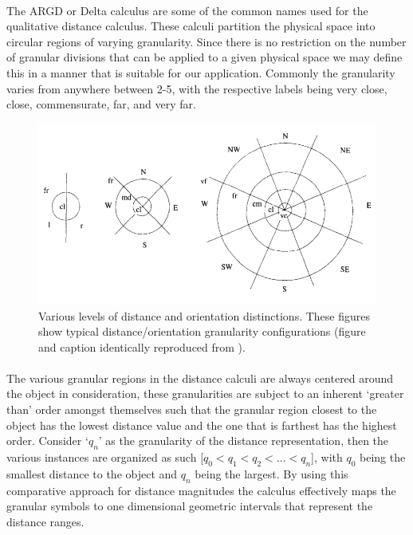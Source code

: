 	\paragraph{}The ARGD or Delta calculus are some of the common names used for the qualitative distance calculus. These calculi partition the physical space into circular regions of varying granularity. Since there is no restriction on the number of granular divisions that can be applied to a given physical space we may define this in a manner that is suitable for our application. Commonly the granularity varies from anywhere between 2-5, with the respective labels being very close, close, commensurate, far, and very far.
	
	\begin{figure}[h]
		\centering
		\includegraphics[width=0.7\linewidth]{images/distance_cal}
		\caption{ Various levels of distance and orientation distinctions. These figures show typical distance/orientation granularity configurations (figure and caption identically reproduced from \cite{clementini1997qualitative}). }
		\label{fig:distancecal}
	\end{figure}
	
	\paragraph{} The various granular regions in the distance calculi are always centered around the object in consideration, these granularities are subject to an inherent `greater than' order amongst themselves such that the granular region closest to the object has the lowest distance value and the one that is farthest has the highest order. Consider `$q_n$' as the granularity of the distance representation, then the various instances are organized as such [$q_0 < q_1 < q_2 < . . . < q_n$], with $q_0$ being the smallest distance to the object and $q_n$ being the largest. By using this comparative approach for distance magnitudes the calculus effectively maps the granular symbols to one dimensional geometric intervals that represent the distance ranges.
	
